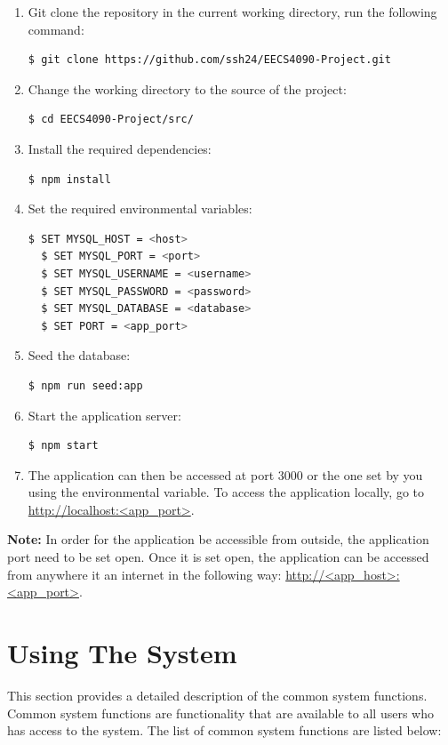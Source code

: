 \documentclass[fontsize=12pt,paper=letter,twoside]{scrartcl}
\begin{document}
\smallskip
\begin{enumerate}
\item Git clone the repository in the current working directory, run the following command:
\begin{lstlisting}[language=bash]
  $ git clone https://github.com/ssh24/EECS4090-Project.git
\end{lstlisting}
\item Change the working directory to the source of the project:
\begin{lstlisting}[language=bash]
  $ cd EECS4090-Project/src/
\end{lstlisting}
\item Install the required dependencies:
\begin{lstlisting}[language=bash]
  $ npm install
\end{lstlisting}
\item Set the required environmental variables:
\begin{lstlisting}[language=bash]
  $ SET MYSQL_HOST = <host>
  $ SET MYSQL_PORT = <port>
  $ SET MYSQL_USERNAME = <username>
  $ SET MYSQL_PASSWORD = <password>
  $ SET MYSQL_DATABASE = <database>
  $ SET PORT = <app_port>
\end{lstlisting}
\item Seed the database:
\begin{lstlisting}[language=bash]
  $ npm run seed:app
\end{lstlisting}
\item Start the application server:
\begin{lstlisting}[language=bash]
  $ npm start
\end{lstlisting}
\item The application can then be accessed at port 3000 or the one set by you using the environmental variable. To access the application locally, go to \url{http://localhost:<app_port>}.
\end{enumerate}

\bigskip
\noindent \textbf{Note:} In order for the application be accessible from outside, the application port need to be set open. Once it is set open, the application can be accessed from anywhere it an internet in the following way: \url{http://<app_host>:<app_port>}.

\newpage
\section{Using The System}
This section provides a detailed description of the common system functions. Common system functions are functionality that are available to all users who has access to the system. The list of common system functions are listed below:
\end{document}
